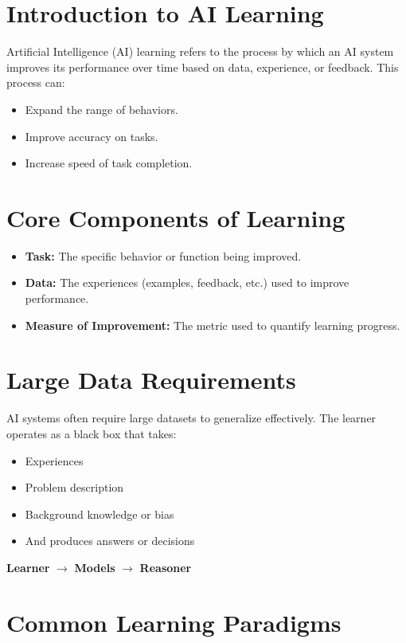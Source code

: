 
\section{Introduction to AI Learning}

Artificial Intelligence (AI) learning refers to the process by which an AI system improves its performance over time based on data, experience, or feedback. This process can:

\begin{itemize}
    \item Expand the range of behaviors.
    \item Improve accuracy on tasks.
    \item Increase speed of task completion.
\end{itemize}

\section{Core Components of Learning}

\begin{itemize}
    \item \textbf{Task:} The specific behavior or function being improved.
    \item \textbf{Data:} The experiences (examples, feedback, etc.) used to improve performance.
    \item \textbf{Measure of Improvement:} The metric used to quantify learning progress.
\end{itemize}

\section{Large Data Requirements}

AI systems often require large datasets to generalize effectively. The learner operates as a black box that takes:

\begin{itemize}
    \item Experiences
    \item Problem description
    \item Background knowledge or bias
    \item And produces answers or decisions
\end{itemize}

\textbf{Learner} $\rightarrow$ \textbf{Models} $\rightarrow$ \textbf{Reasoner}

\section{Common Learning Paradigms}

